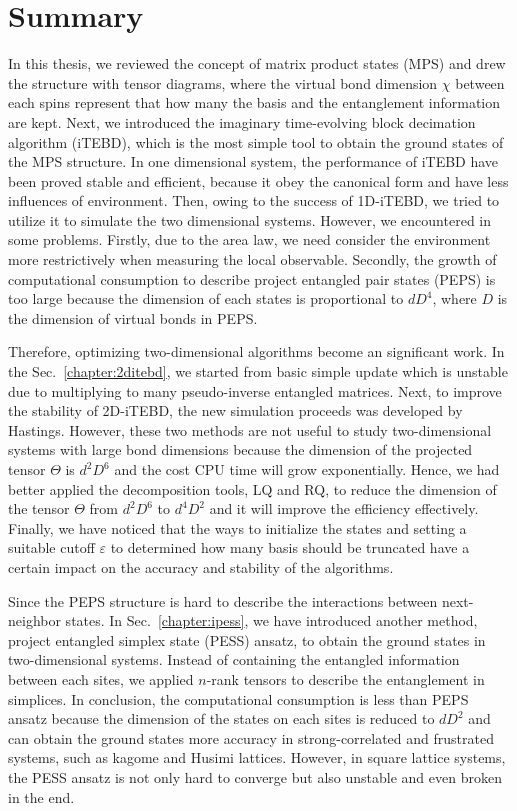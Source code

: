 \chapter{Summary}
\label{chapter:summary}

In this thesis, we reviewed the concept of matrix product states (MPS) and drew the structure with tensor diagrams, where the virtual bond dimension $\chi$ between each spins represent that how many the basis and the entanglement information are kept. Next, we introduced the imaginary time-evolving block decimation algorithm (iTEBD), which is the most simple tool to obtain the ground states of the MPS structure. In one dimensional system, the performance of iTEBD have been proved stable and efficient, because it obey the canonical form and have less influences of environment. Then, owing to the success of 1D-iTEBD, we tried to utilize it to simulate the two dimensional systems. However, we encountered in some problems. Firstly, due to the area law, we need consider the environment more restrictively when measuring the local observable. Secondly, the growth of computational consumption to describe project entangled pair states (PEPS) is too large because the dimension of each states is proportional to $dD^4$, where $D$ is the dimension of virtual bonds in PEPS.

Therefore, optimizing two-dimensional algorithms become an significant work. In the Sec.~\ref{chapter:2ditebd}, we started from basic simple update which is unstable due to multiplying to many pseudo-inverse entangled matrices. Next, to improve the stability of 2D-iTEBD, the new simulation proceeds was developed by Hastings. However, these two methods are not useful to study two-dimensional systems with large bond dimensions because the dimension of the projected tensor $\Theta$ is $d^2D^6$ and the cost CPU time will grow exponentially. Hence, we had better applied the decomposition tools, LQ and RQ, to reduce the dimension of the tensor $\Theta$ from $d^2D^6$ to $d^4D^2$ and it will improve the efficiency effectively. Finally, we have noticed that the ways to initialize the states and setting a suitable cutoff $\varepsilon$ to determined how many basis should be truncated have a certain impact on the accuracy and stability of the algorithms. 

Since the PEPS structure is hard to describe the interactions between next-neighbor states. In Sec.~\ref{chapter:ipess}, we have introduced another method, project entangled simplex state (PESS) ansatz, to obtain the ground states in two-dimensional systems. Instead of containing the entangled information between each sites, we applied $n$-rank tensors to describe the entanglement in simplices. In conclusion, the computational consumption is less than PEPS ansatz because the dimension of the states on each sites is reduced to $dD^2$ and can obtain the ground states more accuracy in strong-correlated and frustrated systems, such as kagome and Husimi lattices. However, in square lattice systems, the PESS ansatz is not only hard to converge but also unstable and even broken in the end.

